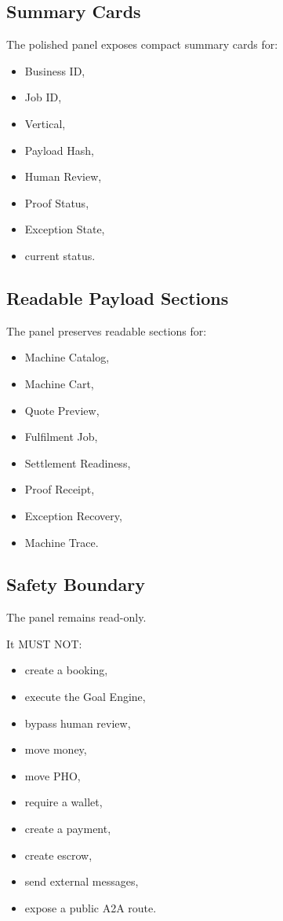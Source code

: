 \subsection{Summary Cards}

The polished panel exposes compact summary cards for:

\begin{itemize}
  \item Business ID,
  \item Job ID,
  \item Vertical,
  \item Payload Hash,
  \item Human Review,
  \item Proof Status,
  \item Exception State,
  \item current status.
\end{itemize}

\subsection{Readable Payload Sections}

The panel preserves readable sections for:

\begin{itemize}
  \item Machine Catalog,
  \item Machine Cart,
  \item Quote Preview,
  \item Fulfilment Job,
  \item Settlement Readiness,
  \item Proof Receipt,
  \item Exception Recovery,
  \item Machine Trace.
\end{itemize}

\subsection{Safety Boundary}

The panel remains read-only.

It MUST NOT:

\begin{itemize}
  \item create a booking,
  \item execute the Goal Engine,
  \item bypass human review,
  \item move money,
  \item move PHO,
  \item require a wallet,
  \item create a payment,
  \item create escrow,
  \item send external messages,
  \item expose a public A2A route.
\end{itemize}

